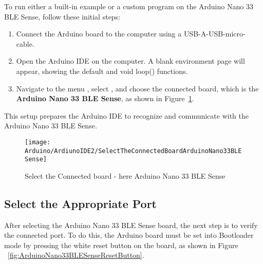 

To run either a built-in example or a custom program on the Arduino Nano 33 BLE Sense, follow these initial steps:

\begin{enumerate}
	
	\item Connect the Arduino board to the computer using a USB-A-USB-micro-cable.
	\item Open the Arduino IDE on the computer. A blank environment page will appear, showing the default  and \PYTHON
	{void loop()} functions.
	\item Navigate to the menu , select , and choose the connected board, which is the \textbf{Arduino Nano 33 BLE Sense}, as shown in Figure~\ref{fig:SelecttheConnectedboard-hereArduinoNano33BLESense}.
	
\end{enumerate}

This setup prepares the Arduino IDE to recognize and communicate with the Arduino Nano 33 BLE Sense.



\begin{figure}[H]\centering
	\texttt{[image: Arduino/ArdiunoIDE2/SelectTheConnectedBoardArduinoNano33BLESense]}
	\caption{Select the Connected board - here Arduino Nano 33 BLE Sense}
	\label{fig:SelecttheConnectedboard-hereArduinoNano33BLESense}		
\end{figure}


\subsection{Select the Appropriate Port}


After selecting the Arduino Nano 33 BLE Sense board, the next step is to verify the connected port. To do this, the Arduino board must be set into Bootloader mode by pressing the white reset button on the board, as shown in Figure ~\ref{fig:ArduinoNano33BLESenseResetButton}.

\begin{center}
		\label{fig:ArduinoNano33BLESenseResetButton}		
\end{center}



